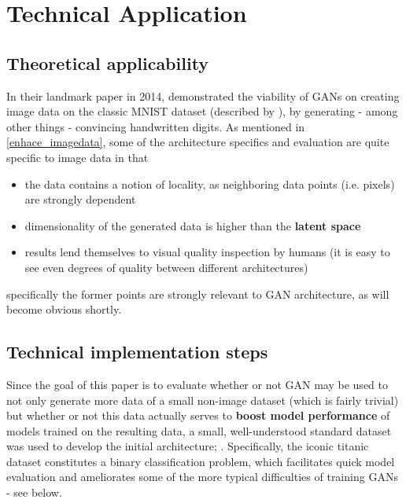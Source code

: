 \chapter{Technical Application}
\label{chapter:technical_application}

\section{Theoretical applicability}
\label{section:theory_application}

In their landmark paper in 2014, \cite{goodfellow2014generative} demonstrated the viability of \acp{GAN} on creating image data on the classic MNIST dataset (described by \cite{mnist}), by generating - among other things - convincing handwritten digits.
As mentioned in \ref{enhace_imagedata}, some of the architecture specifics and evaluation are quite specific to image data in that 

\begin{itemize}
	\item the data contains a notion of locality, as neighboring data points (i.e. pixels) are strongly dependent
	\item dimensionality of the generated data is higher than the \textbf{latent space} 
	\item results lend themselves to visual quality inspection by humans (it is easy to see even degrees of quality between different architectures)
\end{itemize}

specifically the former points are strongly relevant to \ac{GAN} architecture, as will become obvious shortly.

\section{Technical implementation steps}
\label{section:technical_implementation}

Since the goal of this paper is to evaluate whether or not \ac{GAN} may be used to not only generate more data of a small non-image dataset (which is fairly trivial) but whether or not this data actually serves to \textbf{boost model performance} of models trained on the resulting data, a small, well-understood standard dataset was used to develop the initial architecture; \cite{titanic}.
Specifically, the iconic titanic dataset constitutes a binary classification problem, which facilitates quick model evaluation and ameliorates some of the more typical difficulties of training \acp{GAN} - see below.


